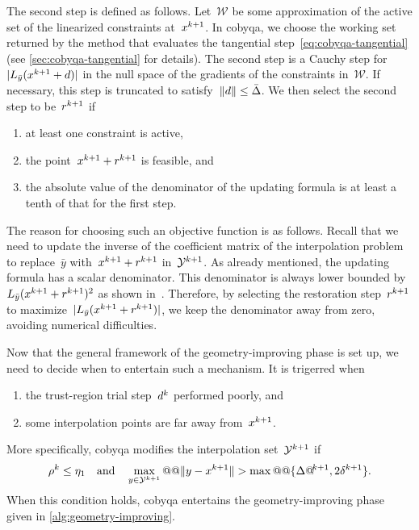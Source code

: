 The second step is defined as follows.
Let~$\mathcal{W}$ be some approximation of the active set of the linearized constraints at~$\iter[k + 1]$.
In \gls{cobyqa}, we choose the working set returned by the method that evaluates the tangential step~\cref{eq:cobyqa-tangential} (see \cref{sec:cobyqa-tangential} for details).
The second step is a Cauchy step for~$\abs{\lagp[\bar{y}](\iter[k + 1] + \step)}$ in the null space of the gradients of the constraints in~$\mathcal{W}$.
If necessary, this step is truncated to satisfy~$\norm{\step} \le \bar{\rad}$.
We then select the second step to be~$\rstep[k + 1]$ if
\begin{enumerate}
    \item at least one constraint is active,
    \item the point~$\iter[k + 1] + \rstep[k + 1]$ is feasible, and
    \item the absolute value of the denominator of the updating formula is at least a tenth of that for the first step.
\end{enumerate}

The reason for choosing such an objective function is as follows.
Recall that we need to update the inverse of the coefficient matrix of the interpolation problem to replace~$\bar{y}$ with~$\iter[k + 1] + \rstep[k + 1]$ in~$\xpt[k + 1]$.
As already mentioned, the updating formula has a scalar denominator.
This denominator is always lower bounded by~$\lagp[\bar{y}](\iter[k + 1] + \rstep[k + 1])^2$ as shown in~\cite[Eq.~(6.5)]{Powell_2006}.
Therefore, by selecting the restoration step~$\rstep[k + 1]$ to maximize~$\abs{\lagp[\bar{y}](\iter[k + 1] + \rstep[k + 1])}$, we keep the denominator away from zero, avoiding numerical difficulties.

Now that the general framework of the geometry-improving phase is set up, we need to decide when to entertain such a mechanism.
It is trigerred when
\begin{enumerate}
    \item the trust-region trial step~$\step[k]$ performed poorly, and
    \item some interpolation points are far away from~$\iter[k + 1]$.
\end{enumerate}
More specifically, \gls{cobyqa} modifies the interpolation set~$\xpt[k + 1]$ if
\begin{equation*}
    \ratio[k] \le \eta_1 \quad \text{and} \quad \max_{y \in \xpt[k + 1]} @@ \norm{y - \iter[k + 1]} > \max @@ \set{\rad[k + 1], 2 \radlb[k + 1]}.
\end{equation*}
When this condition holds, \gls{cobyqa} entertains the geometry-improving phase given in \cref{alg:geometry-improving}.

